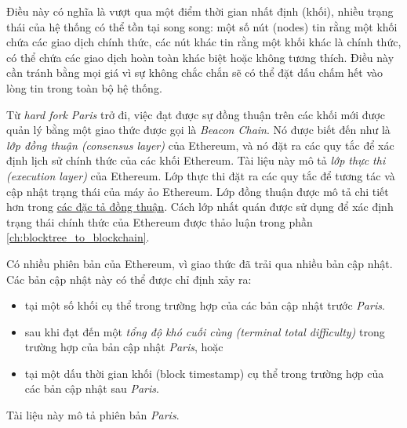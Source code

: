 \documentclass[9pt,oneside]{amsart}
\begin{document}
\begin{multicols}{2}
Điều này có nghĩa là vượt qua một điểm thời gian nhất định (khối), nhiều trạng thái của hệ thống có thể tồn tại song song: một số nút (nodes) tin rằng một khối chứa các giao dịch chính thức, các nút khác tin rằng một khối khác là chính thức, có thể chứa các giao dịch hoàn toàn khác biệt hoặc không tương thích. Điều này cần tránh bằng mọi giá vì sự không chắc chắn sẽ có thể đặt dấu chấm hết vào lòng tin trong toàn bộ hệ thống.

Từ \textit{hard fork} \textit{Paris} trở đi, việc đạt được sự đồng thuận trên các khối mới được quản lý bằng một giao thức được gọi là \textit{Beacon Chain}. Nó được biết đến như là \textit{lớp đồng thuận (consensus layer)} của Ethereum, và nó đặt ra các quy tắc để xác định lịch sử chính thức của các khối Ethereum. Tài liệu này mô tả \textit{lớp thực thi (execution layer)} của Ethereum. Lớp thực thi đặt ra các quy tắc để tương tác và cập nhật trạng thái của máy ảo Ethereum. Lớp đồng thuận được mô tả chi tiết hơn trong \href{https://github.com/ethereum/consensus-specs}{các đặc tả đồng thuận}. Cách lớp nhất quán được sử dụng để xác định trạng thái chính thức của Ethereum được thảo luận trong phần \ref{ch:blocktree_to_blockchain}.

Có nhiều phiên bản của Ethereum, vì giao thức đã trải qua nhiều bản cập nhật. Các bản cập nhật này có thể được chỉ định xảy ra:

\begin{itemize}
  \item tại một số khối cụ thể trong trường hợp của các bản cập nhật trước \textit{Paris}.
  \item sau khi đạt đến một \textit{tổng độ khó cuối cùng (terminal total difficulty)} trong trường hợp của bản cập nhật \textit{Paris}, hoặc
  \item tại một dấu thời gian khối (block timestamp) cụ thể trong trường hợp của các bản cập nhật sau \textit{Paris}.
\end{itemize}

Tài liệu này mô tả phiên bản \textit{Paris}.


\end{multicols}
\end{document}
